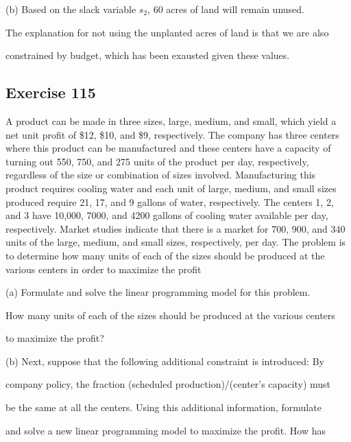 \documentclass{article}
\begin{document}
\vspace{\baselineskip}

(b)
Based on the slack variable $s_2$, 60 acres of land will remain unused. 

The explanation for not using the unplanted acres of land is that we are also 

constrained by budget, which has been exausted given these values.



\subsection*{Exercise 115}
A product can be made in three sizes, large, medium, and small, which yield a net unit profit of
\$12, \$10, and \$9, respectively. The company has three centers where this product can be manufactured and these
centers have a capacity of turning out 550, 750, and 275 units of the product per day, respectively, regardless
of the size or combination of sizes involved. Manufacturing this product requires cooling water and each unit of
large, medium, and small sizes produced require 21, 17, and 9 gallons of water, respectively. The centers 1, 2, and
3 have 10,000, 7000, and 4200 gallons of cooling water available per day, respectively. Market studies indicate
that there is a market for 700, 900, and 340 units of the large, medium, and small sizes, respectively, per day.
The problem is to determine how many units of each of the sizes should be produced at the various centers in
order to maximize the profit

\vspace{\baselineskip}

(a) Formulate and solve the linear programming model for this problem. 

How many units of each of the sizes should be produced at the various centers 

to maximize the profit?

\vspace{\baselineskip}

(b) Next, suppose that the following additional constraint is introduced: By 

company policy, the fraction (scheduled production)/(center’s capacity) must 

be the same at all the centers. Using this additional
information, formulate 

and solve a new linear programming model to maximize the profit. How has 
\end{document}
